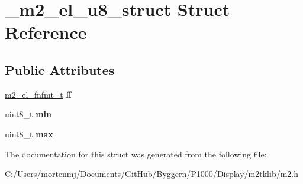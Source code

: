 \hypertarget{struct__m2__el__u8__struct}{\section{\-\_\-m2\-\_\-el\-\_\-u8\-\_\-struct Struct Reference}
\label{struct__m2__el__u8__struct}
}
\subsection*{Public Attributes}
\begin{DoxyCompactItemize}
\item 
\hypertarget{struct__m2__el__u8__struct_a67a3cb131d5296e6e4d851c9b92c7e70}{\hyperlink{struct__m2__el__fnfmt__struct}{m2\-\_\-el\-\_\-fnfmt\-\_\-t} {\bfseries ff}}\label{struct__m2__el__u8__struct_a67a3cb131d5296e6e4d851c9b92c7e70}

\item 
\hypertarget{struct__m2__el__u8__struct_a75fb8d234e2ad83cc485b0f9c1bd8291}{uint8\-\_\-t {\bfseries min}}\label{struct__m2__el__u8__struct_a75fb8d234e2ad83cc485b0f9c1bd8291}

\item 
\hypertarget{struct__m2__el__u8__struct_a8a604dd8be591d6ad13d9ff5bf17e351}{uint8\-\_\-t {\bfseries max}}\label{struct__m2__el__u8__struct_a8a604dd8be591d6ad13d9ff5bf17e351}

\end{DoxyCompactItemize}


The documentation for this struct was generated from the following file\-:\begin{DoxyCompactItemize}
\item 
C\-:/\-Users/mortenmj/\-Documents/\-Git\-Hub/\-Byggern/\-P1000/\-Display/m2tklib/m2.\-h\end{DoxyCompactItemize}

